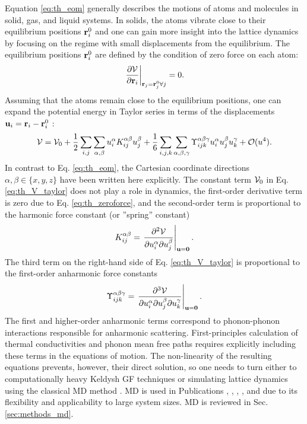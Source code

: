 Equation \eqref{eq:th_eom} generally describes the motions of atoms and molecules in solid, gas, and liquid systems. In solids, the atoms vibrate close to their equilibrium positions $\mathbf{r}_i^0$ and one can gain more insight into the lattice dynamics by focusing on the regime with small displacements from the equilibrium. The equilibrium positions $\mathbf{r}_i^0$ are defined by the condition of zero force on each atom:
\begin{equation}
 \left. \frac{\partial \mathcal{V}}{\partial \mathbf{r}_i} \right|_{\mathbf{r}_j=\mathbf{r}_j^0 \forall j} = 0. \label{eq:th_zeroforce}
\end{equation}
Assuming that the atoms remain close to the equilibrium positions, one can expand the potential energy in Taylor series in terms of the displacements $\mathbf{u}_i=\mathbf{r}_i-\mathbf{r}_i^0$ \cite{ziman}:
\begin{equation}
 \ca{V} = \ca{V}_0 + \frac{1}{2} \sum_{i,j} \sum_{\alpha,\beta} u_i^{\alpha} K_{ij}^{\alpha \beta} u_j^{\beta}  + \frac{1}{6} \sum_{i,j,k} \sum_{\alpha,\beta,\gamma} \Upsilon_{ijk}^{\alpha\beta\gamma}  u_i^{\alpha} u_j^{\beta} u_k^{\gamma} + \mathcal{O}(u^4). \label{eq:th_V_taylor} %
\end{equation}
In contrast to Eq. \eqref{eq:th_eom}, the Cartesian coordinate directions $\alpha,\beta \in \{x,y,z\}$ have been written here explicitly. The constant term $\mathcal{V}_0$ in Eq. \eqref{eq:th_V_taylor} does not play a role in dynamics, the first-order derivative term is zero due to Eq. \eqref{eq:th_zeroforce}, and the second-order term is proportional to the harmonic force constant (or ''spring'' constant) \cite{ziman}
\begin{equation}
 K_{ij}^{\alpha\beta} = \left. \frac{\partial^2 \mathcal{V}}{\partial u_i^{\alpha} \partial u_j^{\beta}} \right|_{\mathbf{u}=\mathbf{0}}. \label{eq:th_K_def}
\end{equation}
The third term on the right-hand side of Eq. \eqref{eq:th_V_taylor} is proportional to the first-order anharmonic force constants
\begin{equation}
 \Upsilon_{ijk}^{\alpha\beta\gamma} = \left. \frac{\partial^3 \mathcal{V}}{\partial u_i^{\alpha} \partial u_j^{\beta} \partial u_k^{\gamma}} \right|_{\mathbf{u}=\mathbf{0}}.
\end{equation}
The first and higher-order anharmonic terms correspond to phonon-phonon interactions \cite{ziman} responsible for anharmonic scattering. First-principles calculation of thermal conductivities and phonon mean free paths requires explicitly including these terms in the equations of motion. The non-linearity of the resulting equations prevents, however, their direct solution, so one needs to turn either to computationally heavy Keldysh GF techniques \cite{wang08} or simulating lattice dynamics using the classical MD method \cite{allentildesley}. MD is used in Publications , , , , and  due to its flexibility and applicability to large system sizes. MD is reviewed in Sec. \ref{sec:methods_md}.

